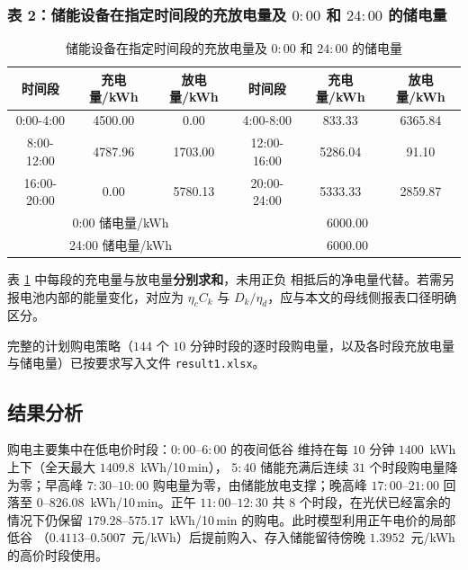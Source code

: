\documentclass[withoutpreface,bwprint]{cumcmthesis}
\begin{document}
\subsubsection{表 2：储能设备在指定时间段的充放电量及 $0{:}00$ 和 $24{:}00$ 的储电量}

\begin{table}[htbp]
  \centering
  \caption{储能设备在指定时间段的充放电量及 $0{:}00$ 和 $24{:}00$ 的储电量}
  \label{tab:p1-storage}
  \begin{tabular}{cccccc}
    \toprule
    时间段 & 充电量/kWh & 放电量/kWh & 时间段 & 充电量/kWh & 放电量/kWh \\
    \midrule
    0:00-4:00   & 4500.00 & 0.00     & 4:00-8:00    & 833.33  & 6365.84 \\
    8:00-12:00  & 4787.96 & 1703.00  & 12:00-16:00  & 5286.04 & 91.10   \\
    16:00-20:00 & 0.00    & 5780.13  & 20:00-24:00  & 5333.33 & 2859.87 \\
    \midrule
    \multicolumn{3}{c}{0:00 储电量/kWh}  & \multicolumn{3}{c}{6000.00} \\
    \multicolumn{3}{c}{24:00 储电量/kWh} & \multicolumn{3}{c}{6000.00} \\
    \bottomrule
  \end{tabular}
\end{table}

表 \ref{tab:p1-storage} 中每段的充电量与放电量\textbf{分别求和}，未用正负
相抵后的净电量代替。若需另报电池内部的能量变化，对应为 $\eta_c C_k$ 与
$D_k/\eta_d$，应与本文的母线侧报表口径明确区分。

完整的计划购电策略（$144$ 个 $10$ 分钟时段的逐时段购电量，以及各时段充放电量
与储电量）已按要求写入文件 \texttt{result1.xlsx}。

\subsection{结果分析}

购电主要集中在低电价时段：$0{:}00$--$6{:}00$ 的夜间低谷
维持在每 $10$ 分钟 $1400$~kWh 上下（全天最大 $1409.8$~kWh/10\,min），
$5{:}40$ 储能充满后连续 $31$ 个时段购电量降为零；早高峰 $7{:}30$--$10{:}00$
购电量为零，由储能放电支撑；晚高峰 $17{:}00$--$21{:}00$
回落至 $0$--$826.08$~kWh/10\,min。正午 $11{:}00$--$12{:}30$
共 $8$ 个时段，在光伏已经富余的情况下仍保留 $179.28$--$575.17$~kWh/10\,min
的购电。此时模型利用正午电价的局部低谷
（$0.4113$--$0.5007$~元/kWh）后提前购入、存入储能留待傍晚 $1.3952$~元/kWh
的高价时段使用。
\end{document}
